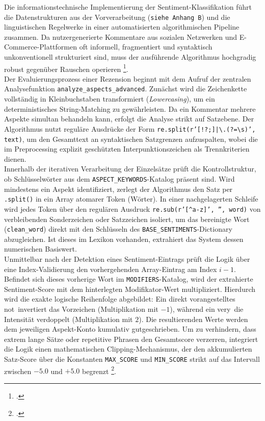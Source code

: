\documentclass[12pt]{article}
\begin{document}
Die informationstechnische Implementierung der Sentiment-Klassifikation führt die Datenstrukturen aus der Vorverarbeitung (\texttt{siehe Anhang B}) und die linguistischen Regelwerke in einer automatisierten algorithmischen Pipeline zusammen. Da nutzergenerierte Kommentare aus sozialen Netzwerken und E-Commerce-Plattformen oft informell, fragmentiert und syntaktisch unkonventionell strukturiert sind, muss der ausführende Algorithmus hochgradig robust gegenüber Rauschen operieren \footcite[1 ff.]{kiritchenko-2014}.\\
Der Evaluierungsprozess einer Rezension beginnt mit dem Aufruf der zentralen Analysefunktion \texttt{analyze\_aspects\_advanced}. Zunächst wird die Zeichenkette vollständig in Kleinbuchstaben transformiert (\textit{Lowercasing}), um ein deterministisches String-Matching zu gewährleisten. Da ein Kommentar mehrere Aspekte simultan behandeln kann, erfolgt die Analyse strikt auf Satzebene. Der Algorithmus nutzt reguläre Ausdrücke der Form \texttt{re.split(r'[!?;]|\textbackslash.(?=\textbackslash s)', text)}, um den Gesamttext an syntaktischen Satzgrenzen aufzuspalten, wobei die im Preprocessing explizit geschützten Interpunktionszeichen als Trennkriterien dienen.\\
Innerhalb der iterativen Verarbeitung der Einzelsätze prüft die Kontrollstruktur, ob Schlüsselwörter aus dem \texttt{ASPECT\_KEYWORDS}-Katalog präsent sind. Wird mindestens ein Aspekt identifiziert, zerlegt der Algorithmus den Satz per \texttt{.split()} in ein Array atomarer Token (Wörter). In einer nachgelagerten Schleife wird jedes Token über den regulären Ausdruck \texttt{re.sub(r'[\^{}a-z]', '', word)} von verbleibenden Sonderzeichen oder Satzzeichen isoliert, um das bereinigte Wort (\texttt{clean\_word}) direkt mit den Schlüsseln des \texttt{BASE\_SENTIMENTS}-Dictionary abzugleichen. Ist dieses im Lexikon vorhanden, extrahiert das System dessen numerischen Basiswert.\\
Unmittelbar nach der Detektion eines Sentiment-Eintrags prüft die Logik über eine Index-Validierung den vorhergehenden Array-Eintrag am Index $i-1$. Befindet sich dieses vorherige Wort im \texttt{MODIFIERS}-Katalog, wird der extrahierte Sentiment-Score mit dem hinterlegten Modifikator-Wert multipliziert. Hierdurch wird die exakte logische Reihenfolge abgebildet: Ein direkt vorangestelltes \glqq not\grqq\ invertiert das Vorzeichen (Multiplikation mit $-1$), während ein \glqq very\grqq\ die Intensität verdoppelt (Multiplikation mit $2$). Die resultierenden Werte werden dem jeweiligen Aspekt-Konto kumulativ gutgeschrieben. Um zu verhindern, dass extrem lange Sätze oder repetitive Phrasen den Gesamtscore verzerren, integriert die Logik einen mathematischen Clipping-Mechanismus, der den akkumulierten Satz-Score über die Konstanten \texttt{MAX\_SCORE} und \texttt{MIN\_SCORE} strikt auf das Intervall zwischen $-5.0$ und $+5.0$ begrenzt \footcite[272 ff.]{taboada-2011}.\\
\end{document}
